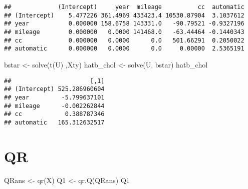 \documentclass[
]{book}
\newenvironment{Shaded}{\begin{snugshade}}{\end{snugshade}}
\newcommand{\FunctionTok}[1]{\textcolor[rgb]{0.00,0.00,0.00}{#1}}
\newcommand{\NormalTok}[1]{#1}
\newcommand{\OtherTok}[1]{\textcolor[rgb]{0.56,0.35,0.01}{#1}}
\begin{document}
\begin{verbatim}
##             (Intercept)     year  mileage          cc  automatic
## (Intercept)    5.477226 361.4969 433423.4 10530.87904  3.1037612
## year           0.000000 158.6758 143331.0   -90.79521 -0.9327196
## mileage        0.000000   0.0000 141468.0   -63.44464 -0.1440343
## cc             0.000000   0.0000      0.0   501.66291  0.2050022
## automatic      0.000000   0.0000      0.0     0.00000  2.5365191
\end{verbatim}

\begin{Shaded}
\begin{Highlighting}[]
\NormalTok{bstar }\OtherTok{\textless{}{-}} \FunctionTok{solve}\NormalTok{(}\FunctionTok{t}\NormalTok{(U) ,Xty)}
\NormalTok{hatb\_chol }\OtherTok{\textless{}{-}} \FunctionTok{solve}\NormalTok{(U, bstar)}
\NormalTok{hatb\_chol}
\end{Highlighting}
\end{Shaded}

\begin{verbatim}
##                      [,1]
## (Intercept) 525.286960604
## year         -5.799637101
## mileage      -0.002262844
## cc            0.388787346
## automatic   165.312632517
\end{verbatim}

\hypertarget{qr}{%
\section{QR}\label{qr}}

\begin{Shaded}
\begin{Highlighting}[]
\NormalTok{QRans }\OtherTok{\textless{}{-}} \FunctionTok{qr}\NormalTok{(X)}
\NormalTok{Q1 }\OtherTok{\textless{}{-}} \FunctionTok{qr.Q}\NormalTok{(QRans)}
\NormalTok{Q1}
\end{Highlighting}
\end{Shaded}
\end{document}
